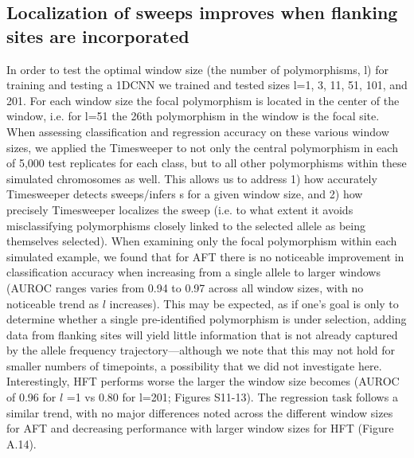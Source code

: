 \subsection{Localization of sweeps improves when flanking sites are incorporated}

In order to test the optimal window size (the number of polymorphisms, l) for training and testing a 1DCNN we trained and tested sizes l=1, 3, 11, 51, 101, and 201. For each window size the focal polymorphism is located in the center of the window, i.e. for l=51 the 26th polymorphism in the window is the focal site. When assessing classification and regression accuracy on these various window sizes, we applied the Timesweeper to not only the central polymorphism in each of 5,000 test replicates for each class, but to all other polymorphisms within these simulated chromosomes as well. This allows us to address 1) how accurately Timesweeper detects sweeps/infers s for a given window size, and 2) how precisely Timesweeper localizes the sweep (i.e. to what extent it avoids misclassifying polymorphisms closely linked to the selected allele as being themselves selected). 
When examining only the focal polymorphism within each simulated example, we found that for AFT there is no noticeable improvement in classification accuracy when increasing from a single allele to larger windows (AUROC ranges varies from 0.94 to 0.97 across all window sizes, with no noticeable trend as $l$ increases). This may be expected, as if one’s goal is only to determine whether a single pre-identified polymorphism is under selection, adding data from flanking sites will yield little information that is not already captured by the allele frequency trajectory—although we note that this may not hold for smaller numbers of timepoints, a possibility that we did not investigate here. Interestingly, HFT performs worse the larger the window size becomes (AUROC of 0.96 for $l$ =1 vs 0.80 for l=201; Figures S11-13). The regression task follows a similar trend, with no major differences noted across the different window sizes for AFT and decreasing performance with larger window sizes for HFT (Figure A.14).
